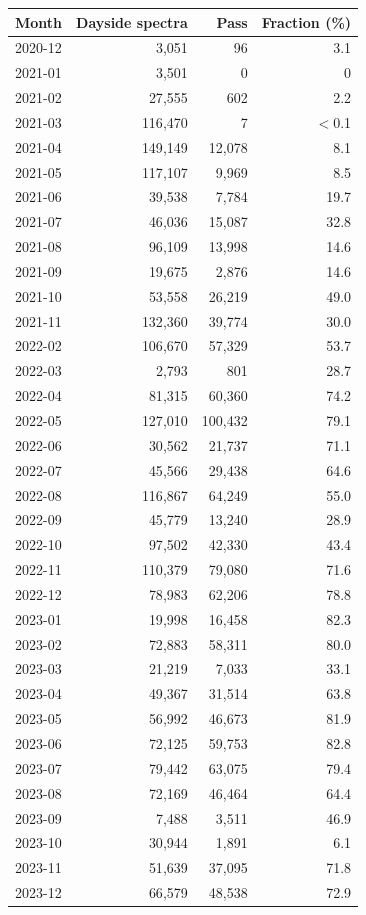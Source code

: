 \begin{tabular}{lrrr}
\toprule
Month & Dayside spectra & Pass & Fraction (\%)\\
\midrule
2020-12 & 3{,}051 & 96 & 3.1\\
2021-01 & 3{,}501 & 0 & 0\\
2021-02 & 27{,}555 & 602 & 2.2\\
2021-03 & 116{,}470 & 7 & $<$0.1\\
2021-04 & 149{,}149 & 12{,}078 & 8.1\\
2021-05 & 117{,}107 & 9{,}969 & 8.5\\
2021-06 & 39{,}538 & 7{,}784 & 19.7\\
2021-07 & 46{,}036 & 15{,}087 & 32.8\\
2021-08 & 96{,}109 & 13{,}998 & 14.6\\
2021-09 & 19{,}675 & 2{,}876 & 14.6\\
2021-10 & 53{,}558 & 26{,}219 & 49.0\\
2021-11 & 132{,}360 & 39{,}774 & 30.0\\
2022-02 & 106{,}670 & 57{,}329 & 53.7\\
2022-03 & 2{,}793 & 801 & 28.7\\
2022-04 & 81{,}315 & 60{,}360 & 74.2\\
2022-05 & 127{,}010 & 100{,}432 & 79.1\\
2022-06 & 30{,}562 & 21{,}737 & 71.1\\
2022-07 & 45{,}566 & 29{,}438 & 64.6\\
2022-08 & 116{,}867 & 64{,}249 & 55.0\\
2022-09 & 45{,}779 & 13{,}240 & 28.9\\
2022-10 & 97{,}502 & 42{,}330 & 43.4\\
2022-11 & 110{,}379 & 79{,}080 & 71.6\\
2022-12 & 78{,}983 & 62{,}206 & 78.8\\
2023-01 & 19{,}998 & 16{,}458 & 82.3\\
2023-02 & 72{,}883 & 58{,}311 & 80.0\\
2023-03 & 21{,}219 & 7{,}033 & 33.1\\
2023-04 & 49{,}367 & 31{,}514 & 63.8\\
2023-05 & 56{,}992 & 46{,}673 & 81.9\\
2023-06 & 72{,}125 & 59{,}753 & 82.8\\
2023-07 & 79{,}442 & 63{,}075 & 79.4\\
2023-08 & 72{,}169 & 46{,}464 & 64.4\\
2023-09 & 7{,}488 & 3{,}511 & 46.9\\
2023-10 & 30{,}944 & 1{,}891 & 6.1\\
2023-11 & 51{,}639 & 37{,}095 & 71.8\\
2023-12 & 66{,}579 & 48{,}538 & 72.9\\
\bottomrule
\end{tabular}
